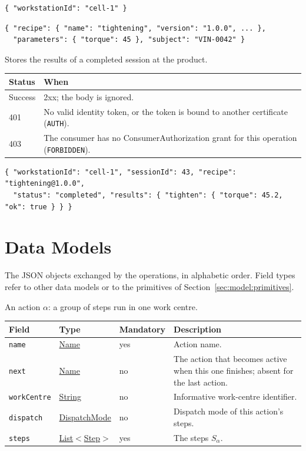 \documentclass[a4paper]{arrowhead}
\newcommand{\mref}[1]{{\textcolor{ArrowheadPurple}{\hyperref[sec:model:#1]{#1}}}}
\newcommand{\pref}[1]{{\textcolor{ArrowheadGrey}{\hyperref[sec:model:primitives:#1]{#1}}}}
\begin{document}
\begin{lstlisting}[caption={Example request body}]
{ "workstationId": "cell-1" }
\end{lstlisting}


\begin{lstlisting}[caption={Example response body}]
{ "recipe": { "name": "tightening", "version": "1.0.0", ... },
  "parameters": { "torque": 45 }, "subject": "VIN-0042" }
\end{lstlisting}

Stores the results of a completed session at the product.

{\small
\begin{longtable}{|p{2.0cm}|p{13.8cm}|}

\hline
\rowcolor{gray!33} Status & When \\ \hline
\endhead
Success & 2xx; the body is ignored. \\ \hline
401 & No valid identity token, or the token is bound to another certificate (\texttt{AUTH}). \\ \hline
403 & The consumer has no ConsumerAuthorization grant for this operation (\texttt{FORBIDDEN}). \\ \hline
\end{longtable}
}


\begin{lstlisting}[caption={Example request body}]
{ "workstationId": "cell-1", "sessionId": 43, "recipe": "tightening@1.0.0",
  "status": "completed", "results": { "tighten": { "torque": 45.2, "ok": true } } }
\end{lstlisting}


\newpage
\section{Data Models}
\label{sec:model}
The JSON objects exchanged by the operations, in alphabetic order. Field types refer to other data models or to the
primitives of Section~\ref{sec:model:primitives}.

An action $\alpha$: a group of steps run in one work centre.

{\small
\begin{longtable}{|p{3.7cm}|p{4.2cm}|p{1.6cm}|p{6.3cm}|}

\hline
\rowcolor{gray!33} Field & Type & Mandatory & Description \\ \hline
\endhead
\texttt{name} & \pref{Name} & yes & Action name. \\ \hline
\texttt{next} & \pref{Name} & no & The action that becomes active when this one finishes; absent for the last action. \\ \hline
\texttt{workCentre} & \pref{String} & no & Informative work-centre identifier. \\ \hline
\texttt{dispatch} & \mref{DispatchMode} & no & Dispatch mode of this action's steps. \\ \hline
\texttt{steps} & \pref{List}$<$\mref{Step}$>$ & yes & The steps $S_\alpha$. \\ \hline
\end{longtable}
}
\end{document}
